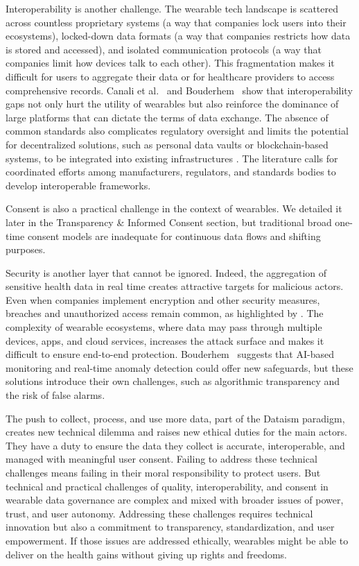 	Interoperability is another challenge. The wearable tech landscape is scattered across countless proprietary systems (a way that companies lock users into their ecosystems), locked-down data formats (a way that companies restricts how data is stored and accessed), and isolated communication protocols (a way that companies limit how devices talk to each other). This fragmentation makes it difficult for users to aggregate their data or for healthcare providers to access comprehensive records. Canali et al.~\cite{Canali2022} and Bouderhem~\cite{Bouderhem2023} show that interoperability gaps not only hurt the utility of wearables but also reinforce the dominance of large platforms that can dictate the terms of data exchange. The absence of common standards also complicates regulatory oversight and limits the potential for decentralized solutions, such as personal data vaults or blockchain-based systems, to be integrated into existing infrastructures \cite{Mun2010}. The literature calls for coordinated efforts among manufacturers, regulators, and standards bodies to develop interoperable frameworks.

	Consent is also a practical challenge in the context of wearables. We detailed it later in the Transparency \& Informed Consent section, but traditional broad one-time consent models are inadequate for continuous data flows and shifting purposes.

	Security is another layer that cannot be ignored. Indeed, the aggregation of sensitive health data in real time creates attractive targets for malicious actors. Even when companies implement encryption and other security measures, breaches and unauthorized access remain common, as highlighted by \cite{Mone2023}. The complexity of wearable ecosystems, where data may pass through multiple devices, apps, and cloud services, increases the attack surface and makes it difficult to ensure end-to-end protection. Bouderhem~\cite{Bouderhem2023} suggests that AI-based monitoring and real-time anomaly detection could offer new safeguards, but these solutions introduce their own challenges, such as algorithmic transparency and the risk of false alarms.

	The push to collect, process, and use more data, part of the Dataism paradigm, creates new technical dilemma and raises new ethical duties for the main actors. They have a duty to ensure the data they collect is accurate, interoperable, and managed with meaningful user consent. Failing to address these technical challenges means failing in their moral responsibility to protect users. But technical and practical challenges of quality, interoperability, and consent in wearable data governance are complex and mixed with broader issues of power, trust, and user autonomy. Addressing these challenges requires technical innovation but also a commitment to transparency, standardization, and user empowerment. If those issues are addressed ethically, wearables might be able to deliver on the health gains without giving up rights and freedoms.
